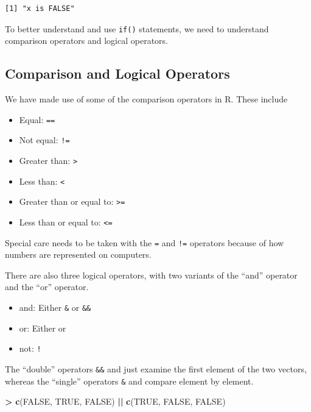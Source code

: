 \documentclass[]{krantz}
\makeatletter
\newenvironment{Shaded}{\begin{snugshade}}{\end{snugshade}}
\newcommand{\KeywordTok}[1]{\textcolor[rgb]{0.27,0.27,0.27}{\textbf{#1}}}
\newcommand{\NormalTok}[1]{#1}
\newcommand{\OperatorTok}[1]{\textcolor[rgb]{0.43,0.43,0.43}{\textbf{#1}}}
\newcommand{\OtherTok}[1]{\textcolor[rgb]{0.37,0.37,0.37}{#1}}
\newcommand{\StringTok}[1]{\textcolor[rgb]{0.5,0.5,0.5}{#1}}
\providecommand{\tightlist}{%
  \setlength{\itemsep}{0pt}\setlength{\parskip}{0pt}}
\newenvironment{kframe}{%
\medskip{}
\setlength{\fboxsep}{.8em}
 \def\at@end@of@kframe{}%
 \ifinner\ifhmode%
  \def\at@end@of@kframe{\end{minipage}}%
  \begin{minipage}{\columnwidth}%
 \fi\fi%
 \def\FrameCommand##1{\hskip\@totalleftmargin \hskip-\fboxsep
 \colorbox{shadecolor}{##1}\hskip-\fboxsep
     \hskip-\linewidth \hskip-\@totalleftmargin \hskip\columnwidth}%
 \MakeFramed {\advance\hsize-\width
   \@totalleftmargin\z@ \linewidth\hsize
   \@setminipage}}%
 {\par\unskip\endMakeFramed%
 \at@end@of@kframe}
\renewenvironment{Shaded}{\begin{kframe}}{\end{kframe}}
\makeatother
\begin{document}
\begin{verbatim}
[1] "x is FALSE"
\end{verbatim}

To better understand and use \texttt{if()} statements, we need to understand comparison operators and logical operators.

\hypertarget{comparison-and-logical-operators}{%
\subsection{Comparison and Logical Operators}\label{comparison-and-logical-operators}}

We have made use of some of the comparison operators in R. These include

\begin{itemize}
\tightlist
\item
  Equal: \texttt{==}
\item
  Not equal: \texttt{!=}
\item
  Greater than: \texttt{\textgreater{}}
\item
  Less than: \texttt{\textless{}}
\item
  Greater than or equal to: \texttt{\textgreater{}=}
\item
  Less than or equal to: \texttt{\textless{}=}
\end{itemize}

Special care needs to be taken with the \texttt{=} and \texttt{!=} operators because of how numbers are represented on computers.

There are also three logical operators, with two variants of the ``and'' operator and the ``or'' operator.

\begin{itemize}
\tightlist
\item
  and: Either \texttt{\&} or \texttt{\&\&}
\item
  or: Either \texttt{\textbar{}} or \texttt{\textbar{}\textbar{}}
\item
  not: \texttt{!}
\end{itemize}

The ``double'' operators \texttt{\&\&} and \texttt{\textbar{}\textbar{}} just examine the first element of the two vectors, whereas the ``single'' operators \texttt{\&} and \texttt{\textbar{}} compare element by element.

\begin{Shaded}
\begin{Highlighting}[]
\OperatorTok{>}\StringTok{ }\KeywordTok{c}\NormalTok{(}\OtherTok{FALSE}\NormalTok{, }\OtherTok{TRUE}\NormalTok{, }\OtherTok{FALSE}\NormalTok{) }\OperatorTok{||}\StringTok{ }\KeywordTok{c}\NormalTok{(}\OtherTok{TRUE}\NormalTok{, }\OtherTok{FALSE}\NormalTok{, }\OtherTok{FALSE}\NormalTok{)}
\end{Highlighting}
\end{Shaded}
\end{document}
